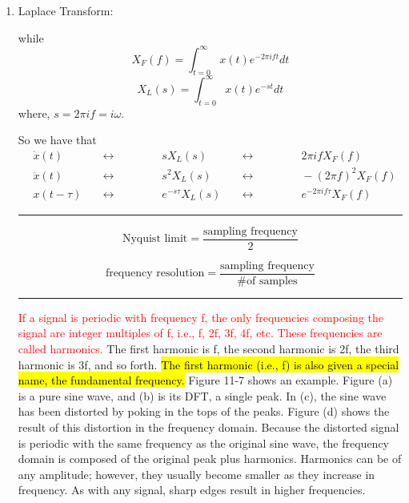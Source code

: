 \documentclass{amsart}
\theoremstyle{definition}
\begin{document}
\begin{enumerate}
\begin{enumerate}
\end{enumerate}

\vspace{.5cm}
\hrule
\vspace{.5cm}
\item Laplace Transform:\\
\bigskip

while
\[X_F(f) = \int_{t=0}^{\infty} x(t)e^{-2 \pi i f t} dt\]
\[X_L(s) = \int_{t=0}^{\infty} x(t)e^{-s t} dt\]
where, $s = 2 \pi i f = i \omega$.
\bigskip

So we have that 
\begin{align*}
&\dot{x}(t) &&\leftrightarrow\qquad\qquad sX_L(s) &&\leftrightarrow\qquad\qquad 2 \pi if X_F (f)\\
&\ddot{x}(t) &&\leftrightarrow\qquad\qquad s^2 X_L (s) &&\leftrightarrow\qquad\qquad -(2 \pi f)^2 X_F (f)\\
&x(t - \tau) &&\leftrightarrow\qquad\qquad e^{-s \tau} X_L (s) &&\leftrightarrow\qquad\qquad e^{-2 \pi if \tau} X_F (f)
\end{align*}

\vspace{.5cm}
\hrule
\vspace{.5cm}

\begin{equation}
\text{Nyquist limit} = \frac {\text{sampling frequency}}{2}
\end{equation}

\begin{equation}
\text{frequency resolution} = \frac {\text{sampling frequency}}{\text{\# of samples}}
\end{equation}

\vspace{.5cm}
\hrule
\vspace{.5cm}

\textcolor{red}{If a signal is periodic with frequency f, the only frequencies composing the signal are integer multiples of f, i.e., f, 2f, 3f, 4f, etc. These frequencies are called harmonics.} The first harmonic is f, the second harmonic is 2f, the third harmonic is 3f, and so forth. \hl{The first harmonic (i.e., f) is also given a special name, the fundamental frequency.} Figure 11-7 shows an example. Figure (a) is a pure sine wave, and (b) is its DFT, a single peak. In (c), the sine wave has been distorted by poking in the tops of the peaks. Figure (d) shows the result of this distortion in the frequency domain. Because the distorted signal is periodic with the same frequency as the original sine wave, the frequency domain is composed of the original peak plus harmonics. Harmonics can be of any amplitude; however, they usually become smaller as they increase in frequency. As with any signal, sharp edges result in higher frequencies.


\end{enumerate}
\end{document}

